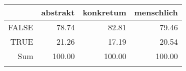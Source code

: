 \begin{tabular}{rrrr}
  \lsptoprule
 & abstrakt & konkretum & menschlich \\ 
  \midrule
FALSE & 78.74 & 82.81 & 79.46 \\ 
  TRUE & 21.26 & 17.19 & 20.54 \\ 
  Sum & 100.00 & 100.00 & 100.00 \\ 
   \lspbottomrule
\end{tabular}
